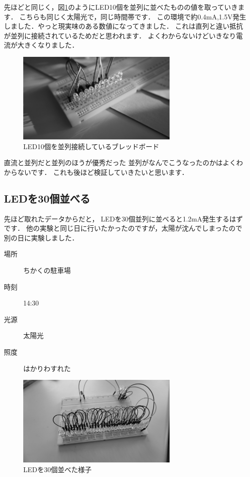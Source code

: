 先ほどと同じく，図\ref{fig:led_par10}のようにLED10個を並列に並べたものの値を取っていきます．
こちらも同じく太陽光で，同じ時間帯です．
この環境で約0.4\si{\milli\ampere},1.5$\si\volt$発生しました．やっと現実味のある数値になってきました．
これは直列と違い抵抗が並列に接続されているためだと思われます．
よくわからないけどいきなり電流が大きくなりました．


\begin{figure}[htbp]
    \centering
    \includegraphics[width=80mm]{./assets/mouse/gray/5.JPG}
    \caption{LED10個を並列接続しているブレッドボード}
    \label{fig:led_par10}
\end{figure}

直流と並列だと並列のほうが優秀だった
並列がなんでこうなったのかはよくわからないです．
これも後ほど検証していきたいと思います．

\subsection{LEDを30個並べる}

先ほど取れたデータからだと，
LEDを30個並列に並べると1.2\si{\milli\ampere}発生するはずです．
他の実験と同じ日に行いたかったのですが，太陽が沈んでしまったので別の日に実験しました．

\begin{description}
  \item[場所]{ちかくの駐車場}
  \item[時刻]{14:30}
  \item[光源]{太陽光}
  \item[照度]{はかりわすれた}
\end{description}


\begin{figure}[htbp]
    \centering
    \includegraphics[width=80mm]{./assets/mouse/gray/10.JPG}
    \caption{LEDを30個並べた様子}
    \label{fig:led_par30}
\end{figure}

